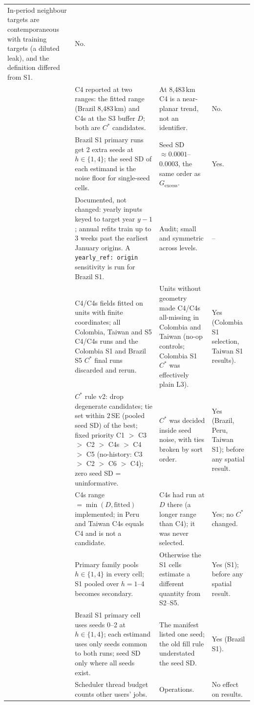 \documentclass[11pt]{article}
\newcommand{\Gex}{G_{\mathrm{excess}}}
\newcommand{\Cstar}{C^{\ast}}
\begin{document}
{\begin{longtable}{>{\raggedright\arraybackslash}p{0.4cm}>{\raggedright\arraybackslash}p{6.4cm}>{\raggedright\arraybackslash}p{5.3cm}>{\raggedright\arraybackslash}p{2.6cm}}
In-period neighbour targets are contemporaneous with training targets (a diluted leak), and the definition differed from S1. & No. \\
15 & C4 reported at two ranges: the fitted range (Brazil 8{,}483\,km) and C4s at the S3 buffer $D$; both are $\Cstar$
candidates. & At 8{,}483\,km C4 is a near-planar trend, not an identifier. & No. \\
16 & Brazil S1 primary runs get 2 extra seeds at $h\in\{1,4\}$; the seed SD of each estimand is the noise floor for
single-seed cells. & Seed SD $\approx 0.0001$--0.0003, the same order as $\Gex$. & Yes. \\
17 & Documented, not changed: yearly inputs keyed to target year $y-1$; annual refits train up to 3 weeks past the earliest
January origins. A \texttt{yearly\_ref: origin} sensitivity is run for Brazil S1. & Audit; small and symmetric across levels. & -- \\
18 & C4/C4s fields fitted on units with finite coordinates; all Colombia, Taiwan and S5 C4/C4s runs and the Colombia S1 and
Brazil S5 $\Cstar$ final runs discarded and rerun. & Units without geometry made C4/C4s all-missing in Colombia and Taiwan
(no-op controls; Colombia S1 $\Cstar$ was effectively plain L3). & Yes (Colombia S1 selection, Taiwan S1 results). \\
19 & $\Cstar$ rule v2: drop degenerate candidates; tie set within $2\,$SE (pooled seed SD) of the best; fixed priority
C1 $>$ C3 $>$ C2 $>$ C4s $>$ C4 $>$ C5 (no-history: C3 $>$ C2 $>$ C6 $>$ C4); zero seed SD = uninformative. &
$\Cstar$ was decided inside seed noise, with ties broken by sort order. & Yes (Brazil, Peru, Taiwan S1); before any spatial result. \\
20 & C4s range $=\min(D,\text{fitted})$ implemented; in Peru and Taiwan C4s equals C4 and is not a candidate. &
C4s had run at $D$ there (a longer range than C4); it was never selected. & Yes; no $\Cstar$ changed. \\
21 & Primary family pools $h\in\{1,4\}$ in every cell; S1 pooled over $h=1$--4 becomes secondary. &
Otherwise the S1 cells estimate a different quantity from S2--S5. & Yes (S1); before any spatial result. \\
22 & Brazil S1 primary cell uses seeds 0--2 at $h\in\{1,4\}$; each estimand uses only seeds common to both runs; seed SD
only where all seeds exist. & The manifest listed one seed; the old fill rule understated the seed SD. & Yes (Brazil S1). \\
23 & Scheduler thread budget counts other users' jobs. & Operations. & No effect on results. \\
\end{longtable}
}
\end{document}
